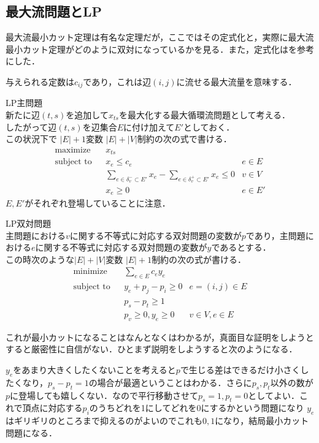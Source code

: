 \documentclass[13pt, a4paper, landscape]{jarticle}
\theoremstyle{nonitalic} %
\begin{document}
\subsection{最大流問題とLP}
最大流最小カット定理は有名な定理だが，ここではその定式化と，実際に最大流最小カット定理がどのように双対になっているかを見る．また，定式化は\cite{kinji}を参考にした．

与えられる定数は$c_{ij}$であり，これは辺$(i,j)$に流せる最大流量を意味する．

LP主問題 \\
新たに辺$(t,s)$を追加して$x_{ts}$を最大化する最大循環流問題として考える． \\
したがって辺$(t,s)$を辺集合$E$に付け加えて$E'$としておく．\\
この状況下で $|E|+1$変数 $|E|+|V|$制約の次の式で書ける．
\begin{align}
 &&&&&\textrm{maximize}   && x_{ts}  \\
 &&&&&\textrm{subject to} && x_e\leq c_e & e \in E  &&&&&\\
 &&&&&                    && \sum_{e \in \delta_v^- \subset E'} x_e - \sum_{e \in \delta_v^+  \subset E'} x_e \leq 0 & v \in V &&&&& \\
 &&&&&                    && x_e \geq 0 & e \in E' &&&&&
\end{align}
$E, E'$がそれぞれ登場していることに注意．


LP双対問題 \\
主問題における$v$に関する不等式に対応する双対問題の変数が$p$であり，主問題における$e$に関する不等式に対応する双対問題の変数が$y$であるとする．\\
この時次のような$|E|+|V|$変数 $|E|+1$制約の次の式が書ける．
\begin{align}
 &&&&&\textrm{minimize}   && \sum_{e \in E} c_e y_e  \\
 &&&&&\textrm{subject to} && y_e + p_j - p_i \geq 0 &  e = (i, j) \in E  &&&&&\\
 &&&&&                    && p_s - p_t  \geq 1         &&&&& \\
 &&&&&                    && p_v \geq 0,  y_e \geq 0 &  v \in V, e \in E &&&&&
\end{align}

これが最小カットになることはなんとなくはわかるが，真面目な証明をしようとすると厳密性に自信がない．ひとまず説明をしようすると次のようになる．

$y_e$をあまり大きくしたくないことを考えると$p$で生じる差はできるだけ小さくしたくなり，$p_s-p_t=1$の場合が最適ということはわかる．さらに$p_s, p_t$以外の数が$p$に登場しても嬉しくない．なので平行移動させて$p_s=1, p_t=0$としてよい．これで頂点に対応する$p_i$のうちどれを1にしてどれを$0$にするかという問題になり $y_e$ はギリギリのところまで抑えるのがよいのでこれも$0,1$になり，結局最小カット問題になる．
\end{document}
